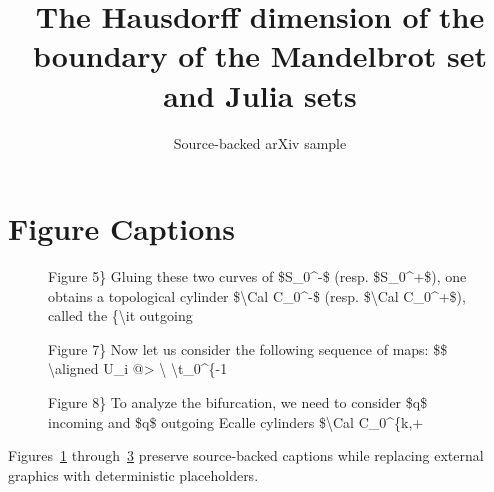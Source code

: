 \documentclass[11pt]{article}
\title{The Hausdorff dimension of the boundary of the Mandelbrot set and Julia
  sets}
\author{Source-backed arXiv sample}
\date{}
\begin{document}
\maketitle
\section{Figure Captions}

\begin{figure}[htbp]
\centering
\fbox{\rule{0pt}{1.15in}\rule{0.78\linewidth}{0pt}}
\caption{Figure 5\} Gluing these two curves of \$S\_0\textasciicircum{}-\$ (resp. \$S\_0\textasciicircum{}+\$), one obtains a topological cylinder \$\textbackslash{}Cal C\_0\textasciicircum{}-\$ (resp. \$\textbackslash{}Cal C\_0\textasciicircum{}+\$), called the \{\textbackslash{}it outgoing}
\label{fig:source-1}
\end{figure}


\begin{figure}[htbp]
\centering
\fbox{\rule{0pt}{1.15in}\rule{0.78\linewidth}{0pt}}
\caption{Figure 7\} Now let us consider the following sequence of maps: \$\$ \textbackslash{}aligned U\_i @> \textbackslash{} \textbackslash{}t\_0\textasciicircum{}\{-1}
\label{fig:source-2}
\end{figure}


\begin{figure}[htbp]
\centering
\fbox{\rule{0pt}{1.15in}\rule{0.78\linewidth}{0pt}}
\caption{Figure 8\} To analyze the bifurcation, we need to consider \$q\$ incoming and \$q\$ outgoing Ecalle cylinders \$\textbackslash{}Cal C\_0\textasciicircum{}\{k,+}
\label{fig:source-3}
\end{figure}


Figures~\ref{fig:source-1} through~\ref{fig:source-3} preserve source-backed captions while replacing external graphics with deterministic placeholders.
\end{document}
